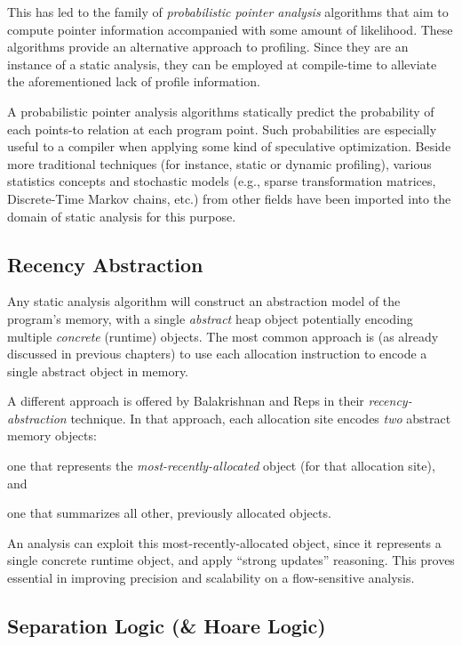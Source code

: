 This has led to the family of \emph{probabilistic pointer analysis} algorithms \todo{} that aim to compute pointer information accompanied with some amount of likelihood. These algorithms provide an alternative approach to profiling. Since they are an instance of a static analysis, they can be employed at compile-time to alleviate the aforementioned lack of profile information.

A probabilistic pointer analysis algorithms statically predict the probability of each points-to relation at each program point. Such probabilities are especially useful to a compiler when applying some kind of speculative optimization. Beside more traditional techniques (for instance, static or dynamic profiling), various statistics concepts and stochastic models (e.g., sparse transformation matrices, Discrete-Time Markov chains, etc.) from other fields have been imported into the domain of static analysis for this purpose.


\subsection{Recency Abstraction}

Any static analysis algorithm will construct an abstraction model of the program's memory, with a single \emph{abstract} heap object potentially encoding multiple \emph{concrete} (runtime) objects. The most common approach is (as already discussed in previous chapters) to use each allocation instruction to encode a single abstract object in memory.

A different approach is offered by Balakrishnan and Reps \todo{} in their \emph{recency-abstraction} technique. In that approach, each allocation site encodes \emph{two} abstract memory objects:
\begin{inparaenum}[(1)]
\item one that represents the \emph{most-recently-allocated} object (for that allocation site), and
\item one that summarizes all other, previously allocated objects.
\end{inparaenum}
An analysis can exploit this most-recently-allocated object, since it represents a single concrete runtime object, and apply ``strong updates'' reasoning. This proves essential in improving precision and scalability on a flow-sensitive analysis.


\subsection{Separation Logic (\& Hoare Logic)}

